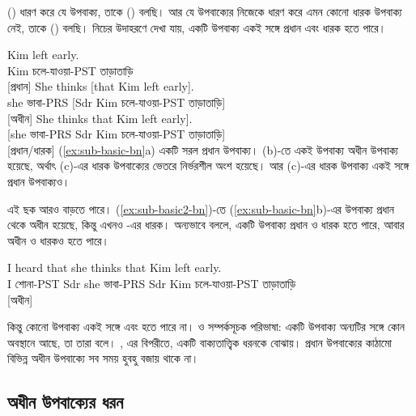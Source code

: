  () ধারণ করে যে উপবাক্য, তাকে  () বলছি। আর যে উপবাক্যের নিজেকে ধারণ করে এমন কোনো ধারক উপবাক্য নেই, তাকে  () বলছি। নিচের উদাহরণে দেখা যায়, একটি উপবাক্য একই সঙ্গে প্রধান এবং ধারক হতে পারে।

\ea \label{ex:sub-basic-bn}
    \ea \gll Kim left early.\\
        Kim চলে-যাওয়া-PST তাড়াতাড়ি\\
    \glt {} [প্রধান]
    \ex \gll She thinks {[}that Kim left early{]}.\\
        she ভাবা-PRS {[}Sdr Kim চলে-যাওয়া-PST তাড়াতাড়ি{]}\\
    \glt {} [অধীন]
    \ex \gll {[}She thinks that Kim left early{]}.\\
        {[}she ভাবা-PRS Sdr Kim চলে-যাওয়া-PST তাড়াতাড়ি{]}\\
    \glt {} [প্রধান/ধারক]
    \z
\z
(\ref{ex:sub-basic-bn}a) একটি সরল প্রধান উপবাক্য। (b)-তে একই উপবাক্য অধীন উপবাক্য হয়েছে, অর্থাৎ (c)-এর ধারক উপবাক্যের ভেতরে নির্ভরশীল অংশ হয়েছে। আর (c)-এর ধারক উপবাক্য একই সঙ্গে প্রধান উপবাক্যও।

এই ছক আরও বাড়তে পারে। (\ref{ex:sub-basic2-bn})-তে (\ref{ex:sub-basic-bn}b)-এর উপবাক্য প্রধান থেকে অধীন হয়েছে, কিন্তু এখনও -এর ধারক। অন্যভাবে বললে, একটি উপবাক্য প্রধান ও ধারক হতে পারে, আবার অধীন ও ধারকও হতে পারে।

\ea\label{ex:sub-basic2-bn}
\gll I heard {\ob}that she thinks {\ob}that Kim left early{\cb}{\cb}.\\
    I শোনা-PST Sdr she ভাবা-PRS Sdr Kim চলে-যাওয়া-PST তাড়াতাড়ি\\
\glt {} [অধীন]
\z

কিন্তু কোনো উপবাক্য একই সঙ্গে  এবং  হতে পারে না।  ও  সম্পর্কসূচক পরিভাষা: একটি উপবাক্য অন্যটির সঙ্গে কোন অবস্থানে আছে, তা তারা বলে। , এর বিপরীতে, একটি বাক্যতাত্ত্বিক ধরনকে বোঝায়। প্রধান উপবাক্যের কাঠামো বিভিন্ন অধীন উপবাক্যে সব সময় হুবহু বজায় থাকে না।

\subsection{অধীন উপবাক্যের ধরন}

